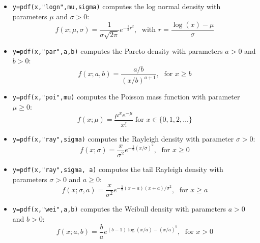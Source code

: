 \begin{mandescription}
\begin{itemize}
\item {} \verb!y=pdf(x,"logn",mu,sigma)! computes
  the log normal density with parameters $\mu$ and $\sigma > 0$:
$$
     f(x; \mu, \sigma) = \frac{ 1 }{ \sigma \sqrt{2\pi}}
     e^{-\frac{1}{2} r^2 }, \; \mbox{ with } r = \frac{\log(x)-\mu}{\sigma}
$$


\item {} \verb!y=pdf(x,"par",a,b)! computes the Pareto
  density with parameters $a > 0$ and $b > 0$:
$$
     f(x; a, b) = \frac{ a/b }{ (x/b)^{a+1} }, \; \mbox{ for } x \ge b
$$


\item {} \verb!y=pdf(x,"poi",mu)! computes
  the Poisson mass function with parameter $\mu \ge 0$:
$$
     f(x; \mu) = \frac{\mu^x e^{-\mu}}{x!} \;\mbox{for } x \in \{0, 1, 2, \dots\}
$$

\item {} \verb!y=pdf(x,"ray",sigma)! computes the Rayleigh
  density with parameter $\sigma > 0$:
$$
     f(x; \sigma) = \frac{x}{\sigma^2} e^{-\frac{1}{2} (x/\sigma)^2 }, \; \mbox{ for } x \ge 0
$$

\item {} \verb!y=pdf(x,"ray",sigma, a)! computes
  the tail Rayleigh density with parameters $\sigma > 0$ and $a \ge 0$:
$$
     f(x; \sigma, a) = \frac{x}{\sigma^2} e^{-\frac{1}{2} (x-a)(x+a)/\sigma^2 }, \; \mbox{ for } x \ge a
$$


\item {} \verb!y=pdf(x,"wei",a,b)! computes the Weibull
  density with parameters $a > 0$ and $b > 0$:
$$
     f(x; a, b) = \frac{b}{a} e^{ (b-1)\log(x/a) - (x/a)^b }, \; \mbox{ for } x > 0
$$

\end{itemize}

\end{mandescription}


